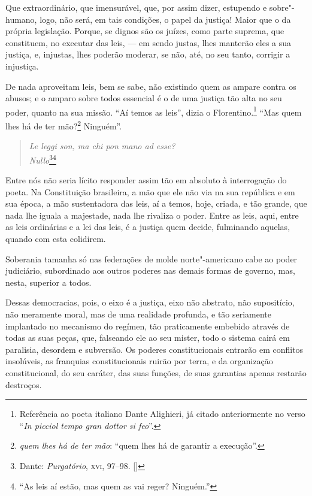 Que extraordinário, que imensurável, que, por assim dizer,
estupendo e sobre"-humano, logo, não será, em tais condições, o papel da
justiça! Maior que o da própria legislação. Porque, se dignos são os
juízes, como parte suprema, que constituem, no executar das leis, --- em
sendo justas, lhes manterão eles a sua justiça, e, injustas, lhes
poderão moderar, se não, até, no seu tanto, corrigir a injustiça.

De nada aproveitam leis, bem se sabe, não existindo quem as ampare
contra os abusos; e o amparo sobre todos essencial é o de uma justiça
tão alta no seu poder, quanto na sua missão. ``Aí temos as
leis'', dizia o Florentino.\footnote{Referência ao poeta italiano Dante
Alighieri, já citado anteriormente no verso ``\textit{In picciol tempo gran dottor si feo}''.} ``Mas quem lhes há de
ter mão?\footnote{ \textit{quem lhes há de ter mão}: ``quem lhes há de garantir a execução''.} Ninguém''.


\begin{verse}
\textit{Le leggi son, ma chi pon mano ad esse?}\\
\textit{Nullo}\footnote[*]{Dante: \emph{Purgatório}, \textsc{xvi}, 97--98. []}\footnote{``As leis aí estão, mas quem as vai reger?
Ninguém.''}
\end{verse}

Entre nós não seria lícito responder assim tão em absoluto à
interrogação do poeta. Na Constituição brasileira, a mão que ele não
via na sua república e em sua época, a mão sustentadora das leis, aí a
temos, hoje, criada, e tão grande, que nada lhe iguala a majestade,
nada lhe rivaliza o poder. Entre as leis, aqui, entre as leis
ordinárias e a lei das leis, é a justiça quem decide, fulminando
aquelas, quando com esta colidirem.

Soberania tamanha só nas federações de molde norte"-americano cabe
ao poder judiciário, subordinado aos outros poderes nas demais formas
de governo, mas, nesta, superior a todos.

Dessas democracias, pois, o eixo é a justiça, eixo não abstrato,
não supositício, não meramente moral, mas de uma realidade profunda, e
tão seriamente implantado no mecanismo do regímen, tão praticamente
embebido através de todas as suas peças, que, falseando ele ao seu
mister, todo o sistema cairá em paralisia, desordem e subversão. Os
poderes constitucionais entrarão em conflitos insolúveis, as franquias
constitucionais ruirão por terra, e da organização constitucional, do
seu caráter, das suas funções, de suas garantias apenas restarão destroços.

